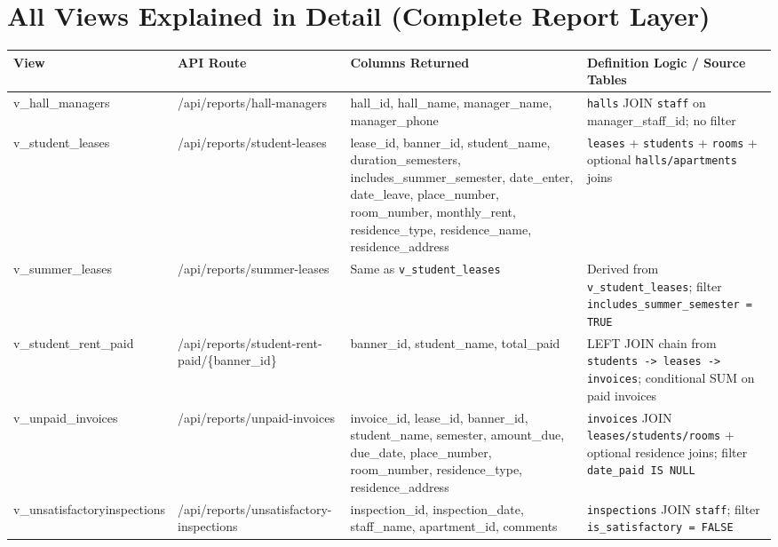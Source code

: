 \documentclass[11pt,a4paper]{article}
\begin{document}
\section{All Views Explained in Detail (Complete Report Layer)}
\begingroup
\scriptsize
\setlength{\tabcolsep}{3pt}
\renewcommand{\arraystretch}{1.08}
\begin{longtable}{>{\raggedright\arraybackslash}p{} >{\raggedright\arraybackslash}p{} >{\raggedright\arraybackslash}p{} >{\raggedright\arraybackslash}p{}}
\toprule
\textbf{View} & \textbf{API Route} & \textbf{Columns Returned} & \textbf{Definition Logic / Source Tables} \\
\midrule
\endhead
v\_hall\_managers & /api/reports/hall-managers & hall\_id, hall\_name, manager\_name, manager\_phone & \texttt{halls} JOIN \texttt{staff} on manager\_staff\_id; no filter \\

v\_student\_leases & /api/reports/student-leases & lease\_id, banner\_id, student\_name, duration\_semesters, includes\_summer\_semester, date\_enter, date\_leave, place\_number, room\_number, monthly\_rent, residence\_type, residence\_name, residence\_address & \texttt{leases} + \texttt{students} + \texttt{rooms} + optional \texttt{halls/apartments} joins \\

v\_summer\_leases & /api/reports/summer-leases & Same as \texttt{v\_student\_leases} & Derived from \texttt{v\_student\_leases}; filter \texttt{includes\_summer\_semester = TRUE} \\

v\_student\_rent\_paid & /api/reports/student-rent-paid/\{banner\_id\} & banner\_id, student\_name, total\_paid & LEFT JOIN chain from \texttt{students -> leases -> invoices}; conditional SUM on paid invoices \\

v\_unpaid\_invoices & /api/reports/unpaid-invoices & invoice\_id, lease\_id, banner\_id, student\_name, semester, amount\_due, due\_date, place\_number, room\_number, residence\_type, residence\_address & \texttt{invoices} JOIN \texttt{leases/students/rooms} + optional residence joins; filter \texttt{date\_paid IS NULL} \\

v\_unsatisfactory\newline inspections & /api/reports/\newline unsatisfactory-inspections & inspection\_id, inspection\_date, staff\_name, apartment\_id, comments & \texttt{inspections} JOIN \texttt{staff}; filter \texttt{is\_satisfactory = FALSE} \\


\end{longtable}
\end{document}
